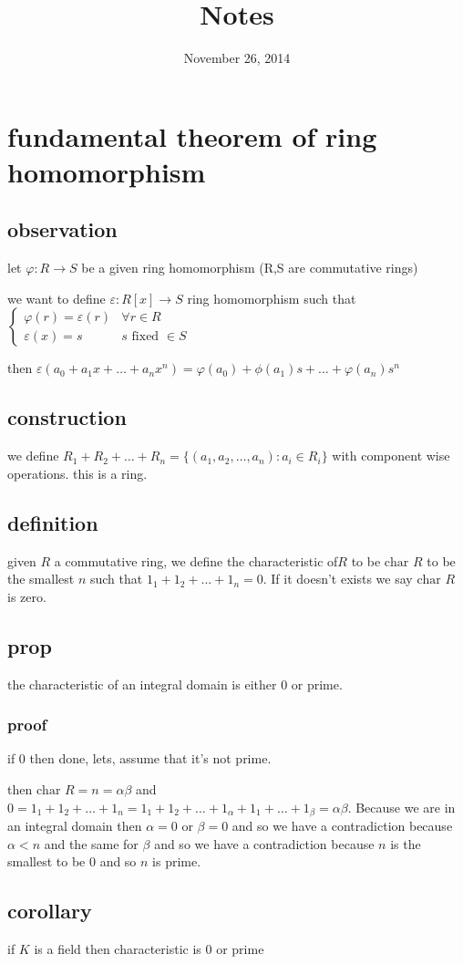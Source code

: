 \documentclass[letterpaper]{article}
\begin{document}
\title{Notes}
\date{November 26, 2014}
\maketitle
\section*{fundamental theorem of ring homomorphism}

\subsection*{observation}
let $\varphi:R\to S$ be a given ring homomorphism (R,S are commutative rings)

we want to define $\varepsilon:R[x]\to S$ ring homomorphism such that $\begin{cases}\varphi(r)=\varepsilon(r)&\forall r\in R\\\varepsilon(x)=s&s\text{ fixed }\in S\end{cases}$

then $\varepsilon(a_0+a_1x+\dots+a_nx^n)=\varphi(a_0)+\phi(a_1)s+\dots+\varphi(a_n)s^n$

\subsection*{construction}
we define $R_1+R_2+\dots+R_n=\{(a_1,a_2,\dots,a_n):a_i\in R_i\}$ with component wise operations. this is a ring.

\subsection*{definition}
given $R$ a commutative ring, we define the characteristic of$R$ to be $\text{char } R$ to be the smallest $n$ such that $1_1+1_2+...+1_n=0$. If it doesn't exists we say $\text{char } R$ is zero.

\subsection*{prop}
the characteristic of an integral domain is either $0$ or prime.

\subsubsection*{proof}
if 0 then done, lets, assume that it's not prime.

then $\text{char } R=n=\alpha\beta$ and $0=1_1+1_2+\dots+1_n=1_1+1_2+\dots+1_\alpha+1_1+\dots+1_\beta=\alpha\beta$. Because we are in an integral domain then $\alpha=0$ or $\beta=0$ and so we have a contradiction because $\alpha<n$ and the same for $\beta$ and so we have a contradiction because $n$ is the smallest to be 0 and so $n$ is prime.

\subsection*{corollary}
if $K$ is a field then characteristic is 0 or prime
\end{document}
